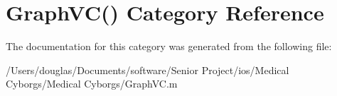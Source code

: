 \hypertarget{category_graph_v_c_07_08}{\section{Graph\-V\-C() Category Reference}
\label{category_graph_v_c_07_08}
}


The documentation for this category was generated from the following file\-:\begin{DoxyCompactItemize}
\item 
/\-Users/douglas/\-Documents/software/\-Senior Project/ios/\-Medical Cyborgs/\-Medical Cyborgs/Graph\-V\-C.\-m\end{DoxyCompactItemize}
